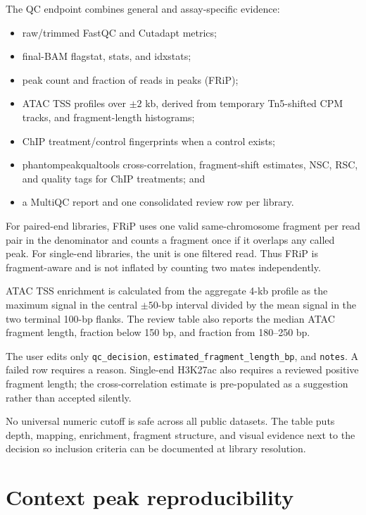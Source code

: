 \documentclass[11pt]{article}
\begin{document}
The QC endpoint combines general and assay-specific evidence:

\begin{itemize}
  \item raw/trimmed FastQC and Cutadapt metrics;
  \item final-BAM flagstat, stats, and idxstats;
  \item peak count and fraction of reads in peaks (FRiP);
  \item ATAC TSS profiles over \(\pm2\) kb, derived from temporary Tn5-shifted
  CPM tracks, and fragment-length histograms;
  \item ChIP treatment/control fingerprints when a control exists;
  \item phantompeakqualtools cross-correlation, fragment-shift estimates,
  NSC, RSC, and quality tags for ChIP treatments; and
  \item a MultiQC report and one consolidated review row per library.
\end{itemize}

For paired-end libraries, FRiP uses one valid same-chromosome fragment per read
pair in the denominator and counts a fragment once if it overlaps any called
peak.  For single-end libraries, the unit is one filtered read.  Thus FRiP is
fragment-aware and is not inflated by counting two mates independently.

ATAC TSS enrichment is calculated from the aggregate 4-kb profile as the
maximum signal in the central \(\pm50\)-bp interval divided by the mean signal
in the two terminal 100-bp flanks.  The review table also reports the median
ATAC fragment length, fraction below 150 bp, and fraction from 180--250 bp.

The user edits only \texttt{qc\_decision},
\texttt{estimated\_fragment\_length\_bp}, and \texttt{notes}.  A failed row
requires a reason.  Single-end H3K27ac also requires a reviewed positive
fragment length; the cross-correlation estimate is pre-populated as a
suggestion rather than accepted silently.

No universal numeric cutoff is safe across all public datasets.  The table
puts depth, mapping, enrichment, fragment structure, and visual evidence next
to the decision so inclusion criteria can be documented at library resolution.

\section{Context peak reproducibility}
\end{document}
